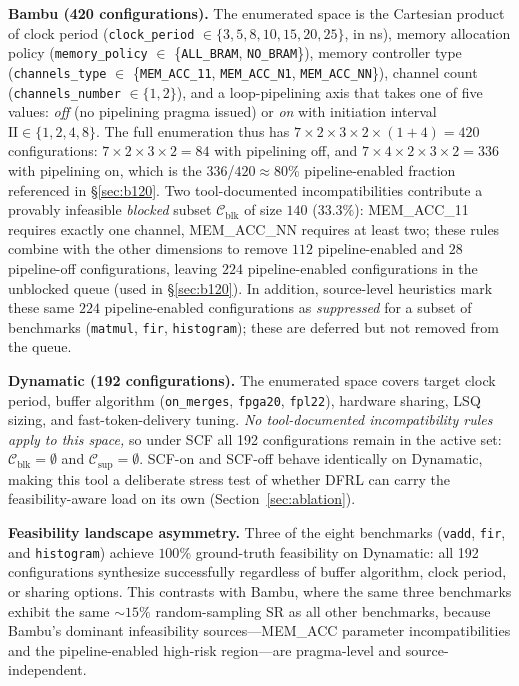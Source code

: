 \documentclass[journal]{IEEEtran}
\begin{document}
\textbf{Bambu (420 configurations).} The enumerated space is the Cartesian product of clock period (\texttt{clock\_period} $\in \{3, 5, 8, 10, 15, 20, 25\}$, in ns), memory allocation policy (\texttt{memory\_policy} $\in$ \{\texttt{ALL\_BRAM}, \texttt{NO\_BRAM}\}), memory controller type (\texttt{channels\_type} $\in$ \{\texttt{MEM\_ACC\_11}, \texttt{MEM\_ACC\_N1}, \texttt{MEM\_ACC\_NN}\}), channel count (\texttt{channels\_number} $\in \{1, 2\}$), and a loop-pipelining axis that takes one of five values: \emph{off} (no pipelining pragma issued) or \emph{on} with initiation interval $\text{II} \in \{1, 2, 4, 8\}$. The full enumeration thus has $7 \times 2 \times 3 \times 2 \times (1 + 4) = 420$ configurations: $7 \times 2 \times 3 \times 2 = 84$ with pipelining off, and $7 \times 4 \times 2 \times 3 \times 2 = 336$ with pipelining on, which is the $336$/$420 \approx 80\%$ pipeline-enabled fraction referenced in \S\ref{sec:b120}. Two tool-documented incompatibilities contribute a provably infeasible \emph{blocked} subset $\mathcal{C}_{\text{blk}}$ of size $140$ ($33.3\%$): MEM\_ACC\_11 requires exactly one channel, MEM\_ACC\_NN requires at least two; these rules combine with the other dimensions to remove $112$ pipeline-enabled and $28$ pipeline-off configurations, leaving $224$ pipeline-enabled configurations in the unblocked queue (used in \S\ref{sec:b120}). In addition, source-level heuristics mark these same $224$ pipeline-enabled configurations as \emph{suppressed} for a subset of benchmarks (\texttt{matmul}, \texttt{fir}, \texttt{histogram}); these are deferred but not removed from the queue.

\textbf{Dynamatic (192 configurations).} The enumerated space covers target clock period, buffer algorithm (\texttt{on\_merges}, \texttt{fpga20}, \texttt{fpl22}), hardware sharing, LSQ sizing, and fast-token-delivery tuning. \emph{No tool-documented incompatibility rules apply to this space,} so under SCF all 192 configurations remain in the active set: $\mathcal{C}_{\text{blk}} = \emptyset$ and $\mathcal{C}_{\text{sup}} = \emptyset$. SCF-on and SCF-off behave identically on Dynamatic, making this tool a deliberate stress test of whether DFRL can carry the feasibility-aware load on its own (Section~\ref{sec:ablation}).

\textbf{Feasibility landscape asymmetry.} Three of the eight benchmarks (\texttt{vadd}, \texttt{fir}, and \texttt{histogram}) achieve $100\%$ ground-truth feasibility on Dynamatic: all 192 configurations synthesize successfully regardless of buffer algorithm, clock period, or sharing options. This contrasts with Bambu, where the same three benchmarks exhibit the same $\sim\!15\%$ random-sampling SR as all other benchmarks, because Bambu's dominant infeasibility sources---MEM\_ACC parameter incompatibilities and the pipeline-enabled high-risk region---are pragma-level and source-independent.
\end{document}
